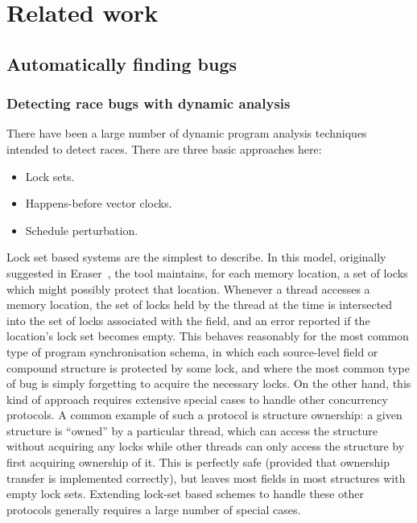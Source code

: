\chapter{Related work}
\label{chapter:related_work}

\section{Automatically finding bugs}

\subsection{Detecting race bugs with dynamic analysis}

There have been a large number of dynamic program analysis techniques
intended to detect races.  There are three basic approaches here:

\begin{itemize}
\item Lock sets.
\item Happens-before vector clocks.
\item Schedule perturbation.
\end{itemize}

Lock set based systems are the simplest to describe.  In this model,
originally suggested in Eraser~\cite{Savage1997}, the tool maintains,
for each memory location, a set of locks which might possibly protect
that location.  Whenever a thread accesses a memory location, the set
of locks held by the thread at the time is intersected into the set of
locks associated with the field, and an error reported if the
location's lock set becomes empty.  This behaves reasonably for the
most common type of program synchronisation schema, in which each
source-level field or compound structure is protected by some lock,
and where the most common type of bug is simply forgetting to acquire
the necessary locks.  On the other hand, this kind of approach
requires extensive special cases to handle other concurrency
protocols.  A common example of such a protocol is structure
ownership: a given structure is ``owned'' by a particular thread,
which can access the structure without acquiring any locks while other
threads can only access the structure by first acquiring ownership of
it.  This is perfectly safe (provided that
ownership transfer is implemented correctly), but leaves most fields
in most structures with empty lock sets.  Extending lock-set based
schemes to handle these other protocols generally requires a large
number of special cases.

